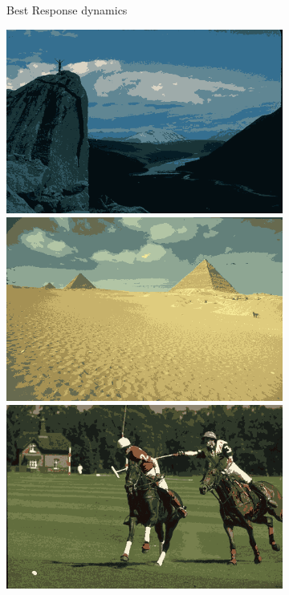 \documentclass{beamer}
\begin{document}
\begin{frame}
\begin{figure}
\begin{subfigure}[b]{0.23\textwidth}
            \caption{Best Response dynamics}
        \end{subfigure}
        \hfill
        \begin{subfigure}[b]{0.23\textwidth}
            \centering
            \includegraphics[width=\textwidth]{../figures/methods/rd/14037_avg.png}
            \includegraphics[width=\textwidth]{../figures/methods/rd/260058_avg.png}
            \includegraphics[width=\textwidth]{../figures/methods/rd/361010_avg.png}

\end{subfigure}
\end{figure}
\end{frame}
\end{document}
